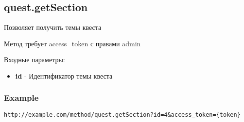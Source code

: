 \subsection{quest.getSection}

Позволяет получить темы квеста

Метод требует access\_token с правами admin

Входные параметры:
\begin{itemize}
  \item \textbf{id} - Идентификатор темы квеста
\end{itemize}

\subsubsection{Example}
\begin{Verbatim}[frame=single]
http://example.com/method/quest.getSection?id=4&access_token={token}
\end{Verbatim}